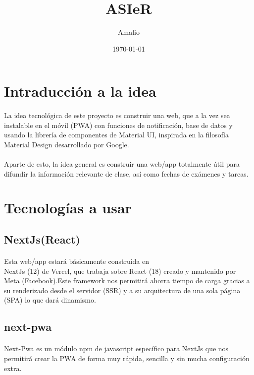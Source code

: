 \documentclass[a4paper]{article}
\title{ASIeR}
\author{Amalio}
\date{\today}
\begin{document}
\maketitle
\tableofcontents
\section[Idea]{Intraducción a la idea}
\paragraph{}
La idea tecnológica de este proyecto es construir una web,
que a la vez sea instalable en el móvil (PWA) con funciones de notificación,
base de datos y usando la librería de componentes de Material UI, inspirada en la filosofía
Material Design desarrollado por Google.
\paragraph{}
Aparte de esto, la idea general es construir una web/app
totalmente útil para difundir la información relevante de clase,
así como fechas de exámenes y tareas.
\section[Tecnologías]{Tecnologías a usar}
\subsection[Next Js]{NextJs(React)}
\paragraph{}
Esta web/app estará básicamente construida en\\ NextJs (12)
de Vercel, que trabaja sobre React (18)
creado y mantenido por Meta (Facebook).Este
framework nos permitirá ahorra tiempo de carga gracias a su
renderizado desde el servidor (SSR) y a su arquitectura de
una sola página (SPA) lo que dará dinamismo.
\subsection[Next-PWA]{next-pwa}
\paragraph{}
Next-Pwa es un módulo npm de javascript específico para NextJs que nos
permitirá crear la PWA de forma muy rápida, sencilla y sin mucha configuración extra.
\end{document}
